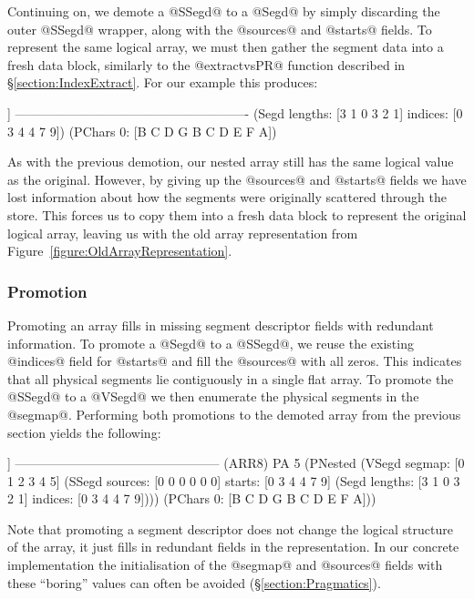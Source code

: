Continuing on, we demote a @SSegd@ to a @Segd@ by simply discarding the outer @SSegd@ wrapper, along with the @sources@ and @starts@ fields. To represent the same logical array, we must then gather the segment data into a fresh data block, similarly to the @extractvsPR@ function described in \S\ref{section:IndexExtract}. For our example this produces:
\par
\begin{small}
\begin{code}
         [ [B C D] [G] [] [B C D] [E F] [A] ]
 -------------------------------------------------------
  (Segd lengths: [3 1 0 3 2 1] indices: [0 3 4 4 7 9])
  (PChars 0: [B C D G B C D E F A])
\end{code}
\end{small}
\par
As with the previous demotion, our nested array still has the same logical value as the original. However, by giving up the @sources@ and @starts@ fields we have lost information about how the segments were originally scattered through the store. This forces us to copy them into a fresh data block to represent the original logical array, leaving us with the old array representation from Figure~\ref{figure:OldArrayRepresentation}.


\subsubsection{Promotion}
\label{section:Promotion}
Promoting an array fills in missing segment descriptor fields with redundant information. To promote a @Segd@ to a @SSegd@, we reuse the existing @indices@ field for @starts@ and fill the @sources@ with all zeros. This indicates that all physical segments lie contiguously in a single flat array. To promote the @SSegd@ to a @VSegd@ we then enumerate the physical segments in the @segmap@. Performing both promotions to the demoted array from the previous section yields the following:
\par
\begin{small}
\begin{code}
          [ [B C D] [G] [] [B C D] [E F] [A] ]
 ------------------------------------------------ (ARR8)
 PA 5 (PNested 
  (VSegd  segmap: [0 1 2 3 4 5]
  (SSegd sources: [0 0 0 0 0 0] starts:  [0 3 4 4 7 9]
  (Segd  lengths: [3 1 0 3 2 1] indices: [0 3 4 4 7 9])))
  (PChars 0: [B C D G B C D E F A]))
\end{code}
\end{small}
%
Note that promoting a segment descriptor does not change the logical structure of the array, it just fills in redundant fields in the representation. In our concrete implementation the initialisation of the @segmap@ and @sources@ fields with these ``boring'' values can often be avoided (\S\ref{section:Pragmatics}).


